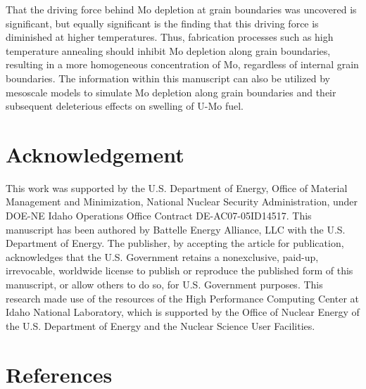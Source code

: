 \documentclass[review]{elsarticle}
\begin{document}
That the driving force behind Mo depletion at grain boundaries was uncovered is significant, but equally significant is the finding that this driving force is diminished at higher temperatures. Thus, fabrication processes such as high temperature annealing should inhibit Mo depletion along grain boundaries, resulting in a more homogeneous concentration of Mo, regardless of internal grain boundaries. The information within this manuscript can also be utilized by mesoscale models to simulate Mo depletion along grain boundaries and their subsequent deleterious effects on swelling of U-Mo fuel.

\section{Acknowledgement}
This work was supported by the U.S. Department of Energy, Office of Material Management and Minimization, National Nuclear Security Administration, under DOE-NE Idaho Operations Office Contract DE-AC07-05ID14517. This manuscript has been authored by Battelle Energy Alliance, LLC with the U.S. Department of Energy. The publisher, by accepting the article for publication, acknowledges that the U.S. Government retains a nonexclusive, paid-up, irrevocable, worldwide license to publish or reproduce the published form of this manuscript, or allow others to do so, for U.S. Government purposes. This research made use of the resources of the High Performance Computing Center at Idaho National Laboratory, which is supported by the Office of Nuclear Energy of the U.S. Department of Energy and the Nuclear Science User Facilities.

\section{References}


\end{document}
